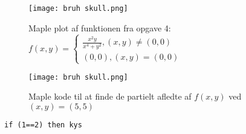 \documentclass[a4paper,12pt]{article}
\begin{document}
\begin{figure} %
    \centering
    \texttt{[image: bruh skull.png]}
    \caption{Maple plot af funktionen fra opgave 4: $f(x,y)=\begin{cases}\frac{x^2 y}{x^4+y^2},(x,y)\neq(0,0)\\ (0,0),(x,y)=(0,0)\end{cases}$}


    \texttt{[image: bruh skull.png]}
    \caption{Maple kode til at finde de partielt afledte af $f(x,y)$ ved $(x,y)=(5,5)$}
\end{figure}

\begin{lstlisting}
if (1==2) then kys
\end{lstlisting}
\end{document}
